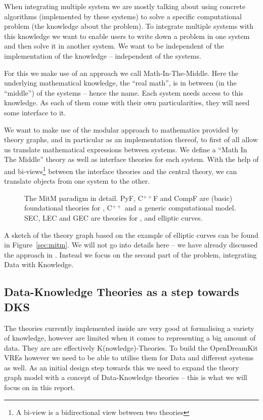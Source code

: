 When integrating multiple system we are mostly talking about using concrete algorithms
(implemented by these systems) to solve a specific computational problem (the knowledge
about the problem). To integrate multiple systems with this knowledge we want to enable
users to write down a problem in one system and then solve it in another system. We want
to be independent of the implementation of the knowledge -- independent of the systems.

For this we make use of an approach we call Math-In-The-Middle. Here the underlying
mathematical knowledge, the ``real math'', is in between (in the ``middle'') of the
systems -- hence the name. Each system needs access to this knowledge. As each of them
come with their own particularities, they will need some interface to it.

We want to make use of the modular approach to mathematics provided by theory graphs, and
in particular \MMT as an implementation thereof, to first of all allow us translate
mathematical expressions between systems. We define a ``Math In The Middle'' theory as
well as interface theories for each system. With the help of \MMT and bi-views\footnote{A
  bi-view is a bidirectional view between two theories} between the interface theories and
the central theory, we can translate objects from one system to the other.

\begin{figure}[ht]\centering
  \def\myxscale{3}\def\myyscale{1.2}
  
  \caption{The MitM paradigm in detail. PyF, C${}^{++}$F and CompF are (basic)
    foundational theories for \python, C${}^{++}$ and a generic computational model. SEC,
    LEC and GEC are theories for \SageMath, \LMFDB and \GAP elliptic curves.}\label{fig:mitm}
\end{figure}

A sketch of the theory graph based on the example of elliptic curves can be found in
Figure~\ref{sec:mitm}. We will not go into details here -- we have already discussed the
approach in \cite{DehKohKon:iop16}. Instead we focus on the second part of the problem,
integrating Data with Knowledge.

\subsection{Data-Knowledge Theories as a step towards DKS}\label{sec:introfinal}

The theories currently implemented inside \MMT are very good at formalising a variety of
knowledge, however are limited when it comes to representing a big amount of data. They
are are effectively K(nowledge)-Theories. To build the OpenDreamKit VREs however we need
to be able to utilise them for Data and different systems as well. As an initial design
step towards this we need to expand the theory graph model with a concept of
Data-Knowledge theories -- this is what we will focus on in this report.


